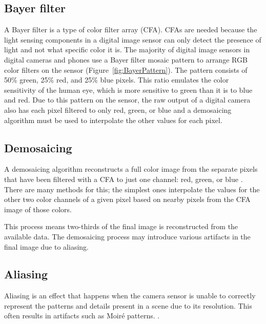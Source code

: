 \documentclass{sig-alternate}
\begin{document}

\subsection{Bayer filter}
\label{sec:background:bayerFilter}

A Bayer filter is a type of color filter array (CFA). CFAs are needed because the light sensing components in a digital image sensor can only detect the presence of light and not what specific color it is. The majority of digital image sensors in digital cameras and phones use a Bayer filter mosaic pattern to arrange RGB color filters on the sensor (Figure~\ref{fig:BayerPattern}). The pattern consists of 50\% green, 25\% red, and 25\% blue pixels. This ratio emulates the color sensitivity of the human eye, which is more sensitive to green than it is to blue and red. Due to this pattern on the sensor, the raw output of a digital camera also has each pixel filtered to only red, green, or blue and a demosaicing algorithm must be used to interpolate the other values for each pixel.~\cite{wiki:BayerFilter}



\subsection{Demosaicing}
\label{sec:background:demosaicing}

A demosaicing algorithm reconstructs a full color image from the separate pixels that have been filtered with a CFA to just one channel: red, green, or blue \cite{wiki:Demosaicing}. There are many methods for this; the simplest ones interpolate the values for the other two color channels of a given pixel based on nearby pixels from the CFA image of those colors.

This process means two-thirds of the final image is reconstructed from the available data. The demosaicing process may introduce various artifacts in the final image due to aliasing.~\cite{blog:Wronski2018}

\subsection{Aliasing}
\label{sec:background:aliasing}

Aliasing is an effect that happens when the camera sensor is unable to correctly represent the patterns and details present in a scene due to its resolution. This often results in artifacts such as Moiré patterns. \cite{blog:Wronski2018}.
\end{document}
